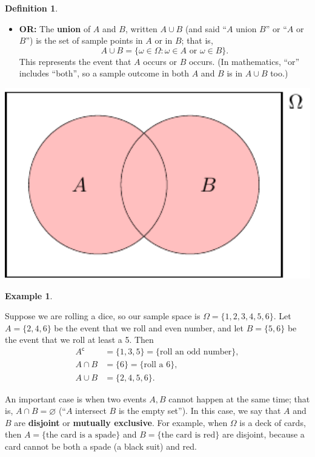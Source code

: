 \documentclass[
  a4paper,
]{book}
\providecommand{\tightlist}{%
  \setlength{\itemsep}{0pt}\setlength{\parskip}{0pt}}
\theoremstyle{definition}
\newtheorem{definition}{Definition}[chapter]
\theoremstyle{definition}
\newtheorem{example}{Example}[chapter]
\theoremstyle{definition}
\theoremstyle{remark}
\begin{document}
\begin{definition}
\begin{itemize}
\tightlist
\item
  \textbf{OR:} The \textbf{union} of \(A\) and \(B\), written \(A \cup B\) (and said ``\(A\) union \(B\)'' or ``\(A\) or \(B\)'') is the set of sample points in \(A\) or in \(B\); that is,
  \[ A \cup B = \{\omega \in \Omega : \omega \in A \text{ or } \omega \in B \} . \]
  This represents the event that \(A\) occurs or \(B\) occurs. (In mathematics, ``or'' includes ``both'', so a sample outcome in both \(A\) and \(B\) is in \(A\cup B\) too.)
\end{itemize}

\begin{center}\includegraphics[width=538pt]{math1710_files/figure-latex/venn-or-1} \end{center}

\end{definition}

\begin{example}
\protect\hypertarget{exm:unlabeled-div-9}{}\label{exm:unlabeled-div-9}

Suppose we are rolling a dice, so our sample space is \(\Omega = \{1,2,3,4,5,6\}\). Let \(A = \{2,4,6\}\) be the event that we roll and even number, and let \(B = \{5,6\}\) be the event that we roll at least a 5. Then
\begin{align*}
A^\mathsf{c}&= \{1,3,5\} = \{\text{roll an odd number}\} ,\\
A \cap B &= \{6\} = \{\text{roll a 6}\} ,\\
A \cup B &= \{2,4,5,6\} .
\end{align*}

\end{example}

An important case is when two events \(A, B\) cannot happen at the same time; that is, \(A \cap B = \varnothing\) (``\(A\) intersect \(B\) is the empty set''). In this case, we say that \(A\) and \(B\) are \textbf{disjoint} or \textbf{mutually exclusive}. For example, when \(\Omega\) is a deck of cards, then \(A = \{\text{the card is a spade}\}\) and \(B = \{\text{the card is red}\}\) are disjoint, because a card cannot be both a spade (a black suit) and red.
\end{document}
